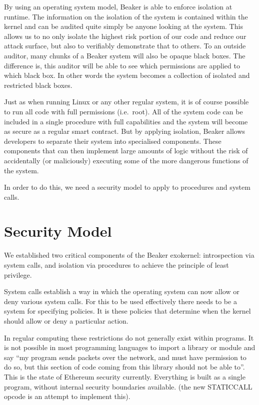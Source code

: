 \documentclass[english,a4paper]{article}
\begin{document}
By using an operating system model, Beaker is able to enforce isolation
at runtime. The information on the isolation of the system is contained
within the kernel and can be audited quite simply be anyone looking at
the system. This allows us to no only isolate the highest risk portion
of our code and reduce our attack surface, but also to verifiably
demonstrate that to others. To an outside auditor, many chunks of a
Beaker system will also be opaque black boxes. The difference is, this
auditor will be able to see which permissions are applied to which black
box. In other words the system becomes a collection of isolated and
restricted black boxes.

Just as when running Linux or any other regular system, it is of course
possible to run all code with full permissions (i.e.~root). All of the
system code can be included in a single procedure with full capabilities
and the system will become as secure as a regular smart contract. But by
applying isolation, Beaker allows developers to separate their system
into specialised components. These components that can then implement
large amounts of logic without the risk of accidentally (or maliciously)
executing some of the more dangerous functions of the system.

In order to do this, we need a security model to apply to procedures and
system calls.

\section{Security Model}\label{security-model}
We established two critical components of the Beaker exokernel:
introspection via system calls, and isolation via procedures to achieve
the principle of least privilege.

System calls establish a way in which the operating system can now allow
or deny various system calls. For this to be used effectively there
needs to be a system for specifying policies. It is these policies that
determine when the kernel should allow or deny a particular action.

In regular computing these restrictions do not generally exist within
programs. It is not possible in most programming languages to import a
library or module and say ``my program sends packets over the network,
and must have permission to do so, but this section of code coming from
this library should not be able to''. This is the state of Ethereum
security currently. Everything is built as a single program, without
internal security boundaries available. (the new STATICCALL opcode is an
attempt to implement this).
\end{document}
